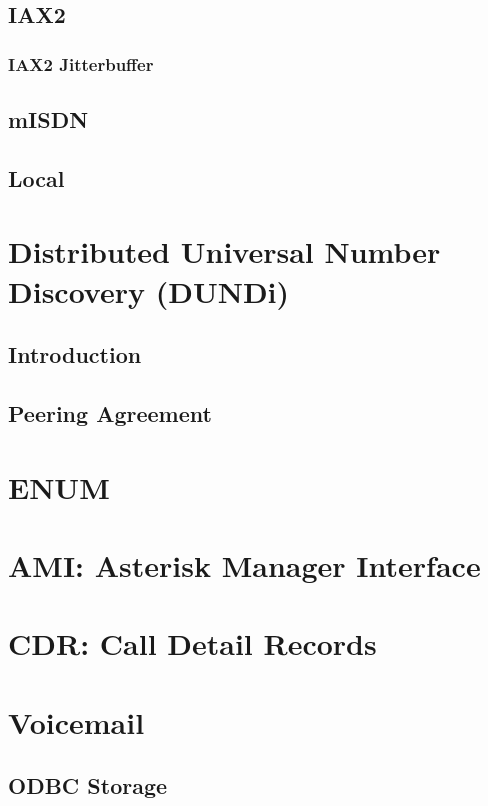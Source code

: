 \documentclass[12pt,a4]{report}
\begin{document}
  \section{IAX2}
  
    \subsection{IAX2 Jitterbuffer}
    
  \section{mISDN}
  
  \section{Local}
  

\chapter{Distributed Universal Number Discovery (DUNDi)}
  \section{Introduction}
  
  \section{Peering Agreement}
  

\chapter{ENUM}


\chapter{AMI: Asterisk Manager Interface}
  
  

\chapter{CDR: Call Detail Records}



\chapter{Voicemail}
  \section{ODBC Storage}
  
\end{document}
